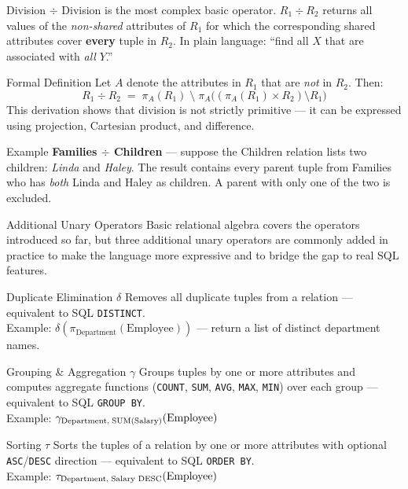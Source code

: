 \begin{frame}{Division $\div$}
  Division is the most complex basic operator.  $R_1 \div R_2$ returns
  all values of the \emph{non-shared} attributes of $R_1$ for which the
  corresponding shared attributes cover \textbf{every} tuple in $R_2$.
  In plain language: ``find all $X$ that are associated with
  \emph{all} $Y$.''

  \begin{block}{Formal Definition}
    Let $A$ denote the attributes in $R_1$ that are \emph{not} in $R_2$.
    Then:
    \[
      R_1 \div R_2 \;=\; \pi_A(R_1)
        \;\setminus\;
        \pi_A\!\bigl((\pi_A(R_1) \times R_2) \setminus R_1\bigr)
    \]
    This derivation shows that division is not strictly primitive — it can
    be expressed using projection, Cartesian product, and difference.
  \end{block}

  \begin{examples}{Example}
    \textbf{Families $\div$ Children} — suppose the Children relation
    lists two children: \emph{Linda} and \emph{Haley}.  The result
    contains every parent tuple from Families who has \emph{both} Linda
    and Haley as children.  A parent with only one of the two is
    excluded.
  \end{examples}
\end{frame}

\begin{frame}{Additional Unary Operators}
  Basic relational algebra covers the operators introduced so far, but
  three additional unary operators are commonly added in practice to make
  the language more expressive and to bridge the gap to real SQL features.

  \begin{block}{Duplicate Elimination $\delta$}
    Removes all duplicate tuples from a relation — equivalent to SQL
    \texttt{DISTINCT}.\\
    Example: $\delta\!\left(\pi_{\text{Department}}(\text{Employee})\right)$
    — return a list of distinct department names.
  \end{block}

  \begin{block}{Grouping \& Aggregation $\gamma$}
    Groups tuples by one or more attributes and computes aggregate
    functions (\texttt{COUNT}, \texttt{SUM}, \texttt{AVG}, \texttt{MAX},
    \texttt{MIN}) over each group — equivalent to SQL \texttt{GROUP BY}.\\
    Example: $\gamma_{\text{Department,\;SUM(Salary)}}(\text{Employee})$
  \end{block}

  \begin{block}{Sorting $\tau$}
    Sorts the tuples of a relation by one or more attributes with optional
    \texttt{ASC}/\texttt{DESC} direction — equivalent to SQL
    \texttt{ORDER BY}.\\
    Example: $\tau_{\text{Department,\;Salary DESC}}(\text{Employee})$
  \end{block}
\end{frame}
